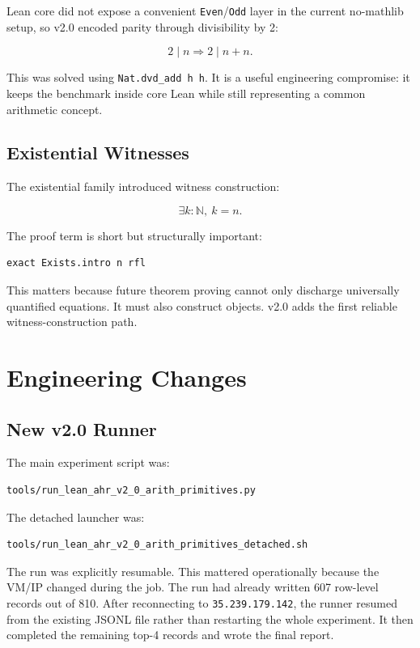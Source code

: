 \documentclass[11pt]{article}
\begin{document}
Lean core did not expose a convenient \texttt{Even}/\texttt{Odd} layer in the current no-mathlib setup, so v2.0
encoded parity through divisibility by 2:

\[
2 \mid n \Rightarrow 2 \mid n+n.
\]

This was solved using \texttt{Nat.dvd\_add h h}. It is a useful engineering compromise: it keeps the benchmark inside
core Lean while still representing a common arithmetic concept.

\subsection{Existential Witnesses}

The existential family introduced witness construction:

\[
\exists k : \mathbb{N},\ k = n.
\]

The proof term is short but structurally important:

\begin{lstlisting}[style=leanstyle]
exact Exists.intro n rfl
\end{lstlisting}

This matters because future theorem proving cannot only discharge universally quantified equations. It must also
construct objects. v2.0 adds the first reliable witness-construction path.

\section{Engineering Changes}

\subsection{New v2.0 Runner}

The main experiment script was:

\begin{lstlisting}[style=leanstyle]
tools/run_lean_ahr_v2_0_arith_primitives.py
\end{lstlisting}

The detached launcher was:

\begin{lstlisting}[style=leanstyle]
tools/run_lean_ahr_v2_0_arith_primitives_detached.sh
\end{lstlisting}

The run was explicitly resumable. This mattered operationally because the VM/IP changed during the job. The run had
already written 607 row-level records out of 810. After reconnecting to \texttt{35.239.179.142}, the runner resumed
from the existing JSONL file rather than restarting the whole experiment. It then completed the remaining top-4
records and wrote the final report.
\end{document}
